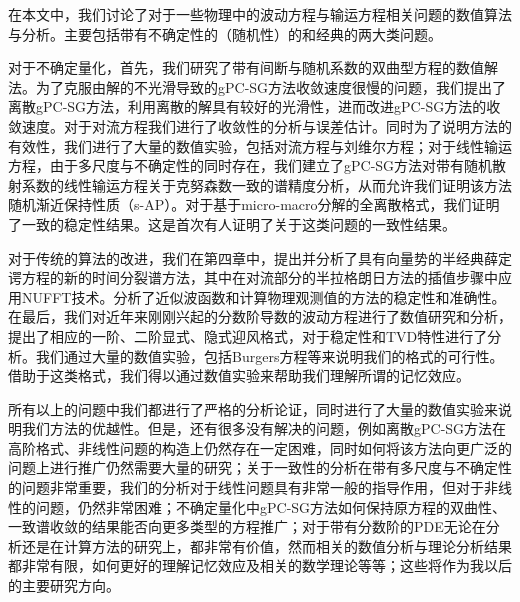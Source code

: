 

\begin{summary}

在本文中，我们讨论了对于一些物理中的波动方程与输运方程相关问题的数值算法与分析。主要包括带有不确定性的（随机性）的和经典的两大类问题。

对于不确定量化，首先，我们研究了带有间断与随机系数的双曲型方程的数值解法。为了克服由解的不光滑导致的gPC-SG方法收敛速度很慢的问题，我们提出了离散gPC-SG方法，利用离散的解具有较好的光滑性，进而改进gPC-SG方法的收敛速度。对于对流方程我们进行了收敛性的分析与误差估计。同时为了说明方法的有效性，我们进行了大量的数值实验，包括对流方程与刘维尔方程；对于线性输运方程，由于多尺度与不确定性的同时存在，我们建立了gPC-SG方法对带有随机散射系数的线性输运方程关于克努森数一致的谱精度分析，从而允许我们证明该方法随机渐近保持性质（s-AP）。对于基于micro-macro分解的全离散格式，我们证明了一致的稳定性结果。这是首次有人证明了关于这类问题的一致性结果。


对于传统的算法的改进，我们在第四章中，提出并分析了具有向量势的半经典薛定谔方程的新的时间分裂谱方法，其中在对流部分的半拉格朗日方法的插值步骤中应用NUFFT技术。分析了近似波函数和计算物理观测值的方法的稳定性和准确性。在最后，我们对近年来刚刚兴起的分数阶导数的波动方程进行了数值研究和分析，提出了相应的一阶、二阶显式、隐式迎风格式，对于稳定性和TVD特性进行了分析。我们通过大量的数值实验，包括Burgers方程等来说明我们的格式的可行性。借助于这类格式，我们得以通过数值实验来帮助我们理解所谓的记忆效应。

所有以上的问题中我们都进行了严格的分析论证，同时进行了大量的数值实验来说明我们方法的优越性。但是，还有很多没有解决的问题，例如离散gPC-SG方法在高阶格式、非线性问题的构造上仍然存在一定困难，同时如何将该方法向更广泛的问题上进行推广仍然需要大量的研究；关于一致性的分析在带有多尺度与不确定性的问题非常重要，我们的分析对于线性问题具有非常一般的指导作用，但对于非线性的问题，仍然非常困难；不确定量化中gPC-SG方法如何保持原方程的双曲性、一致谱收敛的结果能否向更多类型的方程推广；对于带有分数阶的PDE无论在分析还是在计算方法的研究上，都非常有价值，然而相关的数值分析与理论分析结果都非常有限，如何更好的理解记忆效应及相关的数学理论等等；这些将作为我以后的主要研究方向。


\end{summary}
